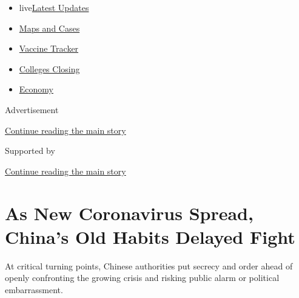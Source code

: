 \begin{itemize}
\tightlist
\item
  live\href{https://www.nytimes3xbfgragh.onion/2020/08/20/world/coronavirus-covid.html?name=styln-coronavirus-national\&region=TOP_BANNER\&variant=undefined\&block=storyline_menu_recirc\&action=click\&pgtype=Article\&impression_id=690d9df1-e38f-11ea-8aa7-fb86b0867258}{Latest
  Updates}
\item
  \href{https://www.nytimes3xbfgragh.onion/interactive/2020/us/coronavirus-us-cases.html?name=styln-coronavirus-national\&region=TOP_BANNER\&variant=undefined\&block=storyline_menu_recirc\&action=click\&pgtype=Article\&impression_id=690d9df2-e38f-11ea-8aa7-fb86b0867258}{Maps
  and Cases}
\item
  \href{https://www.nytimes3xbfgragh.onion/interactive/2020/science/coronavirus-vaccine-tracker.html?name=styln-coronavirus-national\&region=TOP_BANNER\&variant=undefined\&block=storyline_menu_recirc\&action=click\&pgtype=Article\&impression_id=690d9df3-e38f-11ea-8aa7-fb86b0867258}{Vaccine
  Tracker}
\item
  \href{https://www.nytimes3xbfgragh.onion/2020/08/19/us/colleges-closing-covid.html?name=styln-coronavirus-national\&region=TOP_BANNER\&variant=undefined\&block=storyline_menu_recirc\&action=click\&pgtype=Article\&impression_id=690d9df4-e38f-11ea-8aa7-fb86b0867258}{Colleges
  Closing}
\item
  \href{https://www.nytimes3xbfgragh.onion/live/2020/08/20/business/stock-market-today-coronavirus?name=styln-coronavirus-national\&region=TOP_BANNER\&variant=undefined\&block=storyline_menu_recirc\&action=click\&pgtype=Article\&impression_id=690d9df5-e38f-11ea-8aa7-fb86b0867258}{Economy}
\end{itemize}

Advertisement

\protect\hyperlink{after-top}{Continue reading the main story}

Supported by

\protect\hyperlink{after-sponsor}{Continue reading the main story}

\hypertarget{as-new-coronavirus-spread-chinas-old-habits-delayed-fight}{%
\section{As New Coronavirus Spread, China's Old Habits Delayed
Fight}\label{as-new-coronavirus-spread-chinas-old-habits-delayed-fight}}

At critical turning points, Chinese authorities put secrecy and order
ahead of openly confronting the growing crisis and risking public alarm
or political embarrassment.

